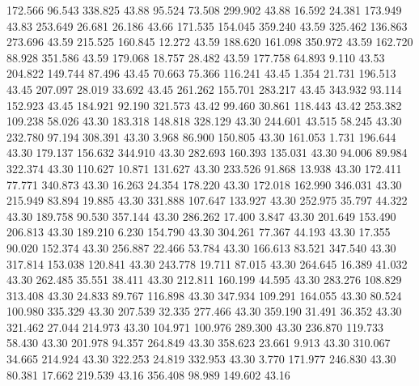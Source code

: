  172.566   96.543  338.825        43.88
  95.524   73.508  299.902        43.88
  16.592   24.381  173.949        43.83
 253.649   26.681   26.186        43.66
 171.535  154.045  359.240        43.59
 325.462  136.863  273.696        43.59
 215.525  160.845   12.272        43.59
 188.620  161.098  350.972        43.59
 162.720   88.928  351.586        43.59
 179.068   18.757   28.482        43.59
 177.758   64.893    9.110        43.53
 204.822  149.744   87.496        43.45
  70.663   75.366  116.241        43.45
   1.354   21.731  196.513        43.45
 207.097   28.019   33.692        43.45
 261.262  155.701  283.217        43.45
 343.932   93.114  152.923        43.45
 184.921   92.190  321.573        43.42
  99.460   30.861  118.443        43.42
 253.382  109.238   58.026        43.30
 183.318  148.818  328.129        43.30
 244.601   43.515   58.245        43.30
 232.780   97.194  308.391        43.30
   3.968   86.900  150.805        43.30
 161.053    1.731  196.644        43.30
 179.137  156.632  344.910        43.30
 282.693  160.393  135.031        43.30
  94.006   89.984  322.374        43.30
 110.627   10.871  131.627        43.30
 233.526   91.868   13.938        43.30
 172.411   77.771  340.873        43.30
  16.263   24.354  178.220        43.30
 172.018  162.990  346.031        43.30
 215.949   83.894   19.885        43.30
 331.888  107.647  133.927        43.30
 252.975   35.797   44.322        43.30
 189.758   90.530  357.144        43.30
 286.262   17.400    3.847        43.30
 201.649  153.490  206.813        43.30
 189.210    6.230  154.790        43.30
 304.261   77.367   44.193        43.30
  17.355   90.020  152.374        43.30
 256.887   22.466   53.784        43.30
 166.613   83.521  347.540        43.30
 317.814  153.038  120.841        43.30
 243.778   19.711   87.015        43.30
 264.645   16.389   41.032        43.30
 262.485   35.551   38.411        43.30
 212.811  160.199   44.595        43.30
 283.276  108.829  313.408        43.30
  24.833   89.767  116.898        43.30
 347.934  109.291  164.055        43.30
  80.524  100.980  335.329        43.30
 207.539   32.335  277.466        43.30
 359.190   31.491   36.352        43.30
 321.462   27.044  214.973        43.30
 104.971  100.976  289.300        43.30
 236.870  119.733   58.430        43.30
 201.978   94.357  264.849        43.30
 358.623   23.661    9.913        43.30
 310.067   34.665  214.924        43.30
 322.253   24.819  332.953        43.30
   3.770  171.977  246.830        43.30
  80.381   17.662  219.539        43.16
 356.408   98.989  149.602        43.16
